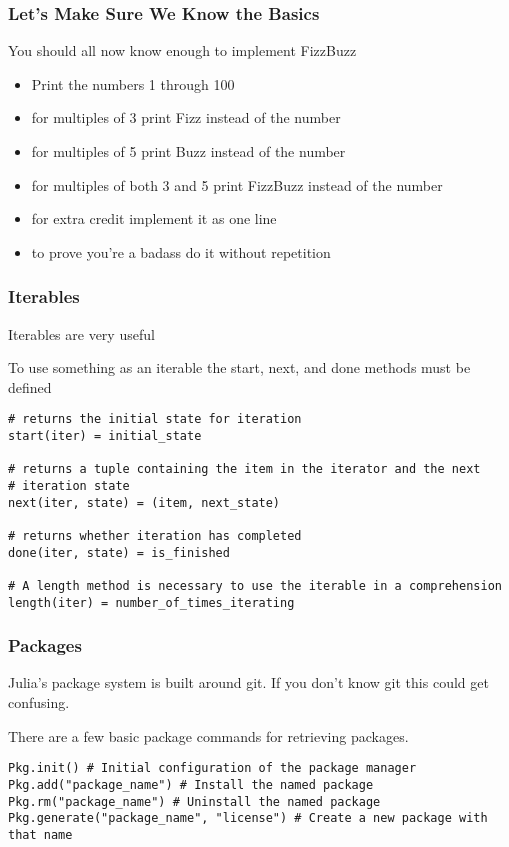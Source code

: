 \documentclass{beamer}
\begin{document}
\begin{frame}
\frametitle{Let's Make Sure We Know the Basics}
You should all now know enough to implement FizzBuzz

\begin{itemize}
  \item Print the numbers 1 through 100
  \item for multiples of 3 print Fizz instead of the number
  \item for multiples of 5 print Buzz instead of the number
  \item for multiples of both 3 and 5 print FizzBuzz instead of the number
  \item for extra credit implement it as one line
  \item to prove you're a badass do it without repetition
\end{itemize}

\end{frame}

\begin{frame}[fragile]
\frametitle{Iterables}

Iterables are very useful

To use something as an iterable the start, next, and done methods must be 
defined

\begin{verbatim}
# returns the initial state for iteration
start(iter) = initial_state

# returns a tuple containing the item in the iterator and the next 
# iteration state
next(iter, state) = (item, next_state)

# returns whether iteration has completed
done(iter, state) = is_finished

# A length method is necessary to use the iterable in a comprehension
length(iter) = number_of_times_iterating
\end{verbatim}

\end{frame}

\begin{frame}[fragile]
\frametitle{Packages}

Julia's package system is built around git. If you don't know git this could 
get confusing.

There are a few basic package commands for retrieving packages.
\begin{verbatim}
Pkg.init() # Initial configuration of the package manager
Pkg.add("package_name") # Install the named package
Pkg.rm("package_name") # Uninstall the named package
Pkg.generate("package_name", "license") # Create a new package with that name
\end{verbatim}

\end{frame}
\end{document}
